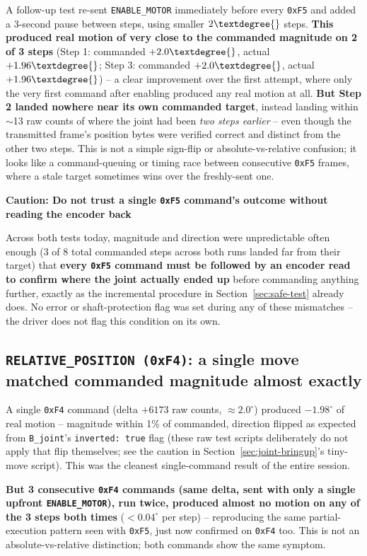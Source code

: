 \documentclass[11pt,letterpaper]{article}
\newenvironment{caution}[1]{%
    \par\addvspace{8pt}%
    \noindent{\color{cautionred}\rule{\linewidth}{0.8pt}}\par\vspace{2pt}
    \noindent\textbf{\color{cautionred}Caution: #1}\par\vspace{2pt}
}{%
    \par\vspace{2pt}\noindent{\color{cautionred}\rule{\linewidth}{0.4pt}}%
    \par\addvspace{8pt}%
}
\begin{document}
A follow-up test re-sent \texttt{ENABLE\_MOTOR} immediately before every \texttt{0xF5} and added a 3-second pause between steps, using smaller $2\textdegree{}$ steps. \textbf{This produced real motion of very close to the commanded magnitude on 2 of 3 steps} (Step 1: commanded $+2.0\textdegree{}$, actual $+1.96\textdegree{}$; Step 3: commanded $+2.0\textdegree{}$, actual $+1.96\textdegree{}$) -- a clear improvement over the first attempt, where only the very first command after enabling produced any real motion at all. \textbf{But Step 2 landed nowhere near its own commanded target}, instead landing within $\sim$13 raw counts of where the joint had been \emph{two steps earlier} -- even though the transmitted frame's position bytes were verified correct and distinct from the other two steps. This is not a simple sign-flip or absolute-vs-relative confusion; it looks like a command-queuing or timing race between consecutive \texttt{0xF5} frames, where a stale target sometimes wins over the freshly-sent one.

\begin{caution}{Do not trust a single \texttt{0xF5} command's outcome without reading the encoder back}
Across both tests today, magnitude and direction were unpredictable often enough (3 of 8 total commanded steps across both runs landed far from their target) that \textbf{every \texttt{0xF5} command must be followed by an encoder read to confirm where the joint actually ended up} before commanding anything further, exactly as the incremental procedure in Section~\ref{sec:safe-test} already does. No error or shaft-protection flag was set during any of these mismatches -- the driver does not flag this condition on its own.
\end{caution}

\subsection{\texttt{RELATIVE\_POSITION (0xF4)}: a single move matched commanded magnitude almost exactly}
A single \texttt{0xF4} command (delta $+6173$ raw counts, $\approx 2.0^\circ$) produced $-1.98^\circ$ of real motion -- magnitude within 1\% of commanded, direction flipped as expected from \texttt{B\_joint}'s \texttt{inverted: true} flag (these raw test scripts deliberately do not apply that flip themselves; see the caution in Section~\ref{sec:joint-bringup}'s tiny-move script). This was the cleanest single-command result of the entire session.

\textbf{But 3 consecutive \texttt{0xF4} commands (same delta, sent with only a single upfront \texttt{ENABLE\_MOTOR}), run twice, produced almost no motion on any of the 3 steps both times} ($<0.04^\circ$ per step) -- reproducing the same partial-execution pattern seen with \texttt{0xF5}, just now confirmed on \texttt{0xF4} too. This is not an absolute-vs-relative distinction; both commands show the same symptom.
\end{document}
